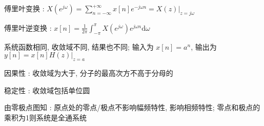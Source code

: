 \documentclass[UTF8, 12pt]{ctexart}
\begin{document}
	傅里叶变换 : $ X(e^{j\omega}) = \sum\limits_{n=-\infty}^{+\infty}x[n]e^{-j\omega n} = X(z)|_{z=j\omega} $

	傅里叶逆变换 : $ x[n] = \frac{1}{2\pi} \int_{-\pi}^{\pi}X(e^{j\omega})e^{j\omega n}\mathrm{d}\omega $

	系统函数相同, 收敛域不同, 结果也不同; 输入为 $ x[n] = a^{n} $, 输出为 $ y[n] = x[n]H(z)|_{z=a} $

	因果性 : 收敛域为大于, 分子的最高次方不高于分母的

	稳定性 : 收敛域包括单位圆

	由零极点图知 : 原点处的零点/极点不影响幅频特性, 影响相频特性; 零点和极点的乘积为1则系统是全通系统
\end{document}
